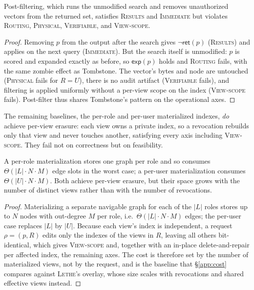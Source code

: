 \documentclass[sigconf, nonacm, review]{acmart}
\begin{document}
\begin{lemma}
\label{lem:postfilter}
Post-filtering, which runs the unmodified search and removes unauthorized
vectors from the returned set, satisfies \textsc{Results} and
\textsc{Immediate} but violates \textsc{Routing}, \textsc{Physical},
\textsc{Verifiable}, and \textsc{View-scope}.
\end{lemma}
\begin{proof}
Removing $p$ from the output after the search gives $\lnot\mathsf{ret}(p)$
(\textsc{Results}) and applies on the next query (\textsc{Immediate}). But the
search itself is unmodified: $p$ is scored and expanded exactly as before, so
$\mathsf{exp}(p)$ holds and \textsc{Routing} fails, with the same zombie
effect as Tombstone. The vector's bytes and node are untouched
(\textsc{Physical} fails for $R=U$), there is no audit artifact
(\textsc{Verifiable} fails), and filtering is applied uniformly without a
per-view scope on the index (\textsc{View-scope} fails). Post-filter thus
shares Tombstone's pattern on the operational axes.
\end{proof}

The remaining baselines, the per-role and per-user materialized indexes,
\emph{do} achieve per-view erasure: each view owns a private index, so a
revocation rebuilds only that view and never touches another, satisfying every
axis including \textsc{View-scope}. They fail not on correctness but on
feasibility.

\begin{proposition}
\label{prop:perview-cost}
A per-role materialization stores one graph per role and so consumes
$\Theta(|L|\cdot N\cdot M)$ edge slots in the worst case; a per-user
materialization consumes $\Theta(|U|\cdot N\cdot M)$. Both achieve per-view
erasure, but their space grows with the number of distinct views rather than
with the number of revocations.
\end{proposition}
\begin{proof}
Materializing a separate navigable graph for each of the $|L|$ roles stores up
to $N$ nodes with out-degree $M$ per role, i.e.\ $\Theta(|L|\cdot N\cdot M)$
edges; the per-user case replaces $|L|$ by $|U|$. Because each view's index is
independent, a request $\rho=(p,R)$ edits only the indexes of the views in
$R$, leaving all others bit-identical, which gives \textsc{View-scope} and,
together with an in-place delete-and-repair per affected index, the remaining
axes. The cost is therefore set by the number of materialized views, not by
the request, and is the baseline that \S\ref{app:cost} compares against
\textsc{Lethe}'s overlay, whose size scales with revocations and shared
effective views instead.
\end{proof}
\end{document}
